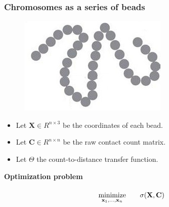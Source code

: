 \documentclass[xcolor=dvipsnames]{beamer}
\begin{document}
\begin{frame}
\frametitle{Chromosomes as a series of beads}

\begin{figure}
\includegraphics[width=0.25\linewidth]{figures/chrom_as_series_beads.jpg}
\end{figure}

\begin{itemize}[label={$\bullet$}]

\item Let $\mathbf{X} \in R^{n \times 3}$ be the coordinates of each bead.
\item Let $\mathbf{C} \in R^{n \times n}$ be the raw contact count matrix.
\item Let $\Theta$ the count-to-distance transfer function.
\end{itemize}

\vspace{2em}
{\color{Blue} \bf Optimization problem}
\begin{equation*}
\renewcommand{\arraystretch}{2}
\begin{array}{ccll}
\underset{{\bf x}_1,\ldots,{\bf x}_n}{\text{minimize}} & &
\sigma(\mathbf{X}, \mathbf{C})\\
\end{array}
\end{equation*}
\end{frame}
\end{document}
